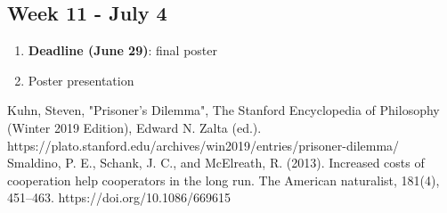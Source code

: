 \documentclass[english]{article}
\begin{document}
\subsection*{Week 11 - July 4}
\begin{enumerate}
\item \textbf{Deadline (June 29)}: final poster
\item Poster presentation
\end{enumerate}




\begin{thebibliography}{9}
   Kuhn, Steven, "Prisoner’s Dilemma", The Stanford Encyclopedia of Philosophy (Winter 2019 Edition), Edward N. Zalta (ed.). https://plato.stanford.edu/archives/win2019/entries/prisoner-dilemma/
   Smaldino, P. E., Schank, J. C., and McElreath, R. (2013). Increased costs of cooperation help cooperators in the long run. The American naturalist, 181(4), 451–463. https://doi.org/10.1086/669615
\end{thebibliography}
\end{document}
